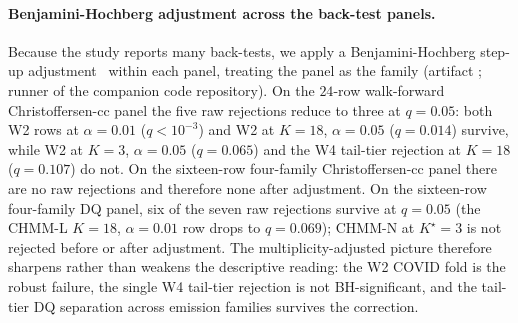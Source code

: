 \paragraph{Benjamini-Hochberg adjustment across the back-test panels.}
Because the study reports many back-tests, we apply a Benjamini-Hochberg step-up adjustment~\citep{benjamini1995controlling} within each panel, treating the panel as the family (artifact ; runner  of the companion code repository). On the $24$-row walk-forward Christoffersen-cc panel the five raw rejections reduce to three at $q = 0.05$: both W2 rows at $\alpha = 0.01$ ($q < 10^{-3}$) and W2 at $K = 18$, $\alpha = 0.05$ ($q = 0.014$) survive, while W2 at $K = 3$, $\alpha = 0.05$ ($q = 0.065$) and the W4 tail-tier rejection at $K = 18$ ($q = 0.107$) do not. On the sixteen-row four-family Christoffersen-cc panel there are no raw rejections and therefore none after adjustment. On the sixteen-row four-family DQ panel, six of the seven raw rejections survive at $q = 0.05$ (the CHMM-L $K = 18$, $\alpha = 0.01$ row drops to $q = 0.069$); CHMM-N at $K^\star = 3$ is not rejected before or after adjustment. The multiplicity-adjusted picture therefore sharpens rather than weakens the descriptive reading: the W2 COVID fold is the robust failure, the single W4 tail-tier rejection is not BH-significant, and the tail-tier DQ separation across emission families survives the correction.

